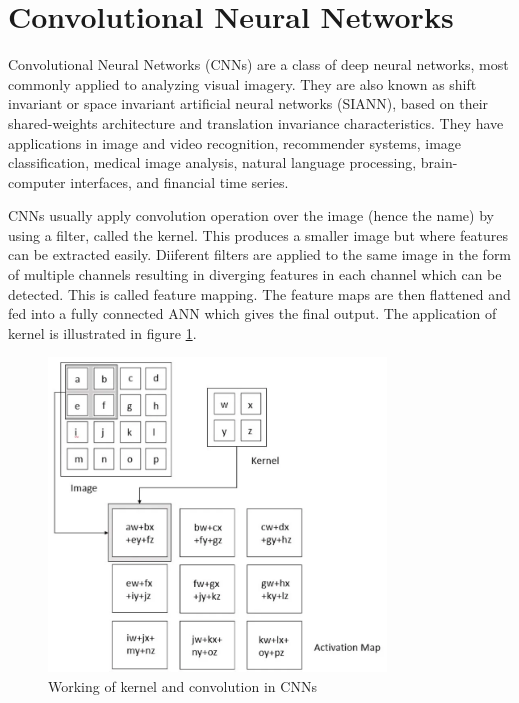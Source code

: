 \section{Convolutional Neural Networks}

Convolutional Neural Networks (CNNs) are a class of deep neural networks, most commonly applied to analyzing visual imagery. They are also known as shift invariant or space invariant artificial neural networks (SIANN), based on their shared-weights architecture and translation invariance characteristics. They have applications in image and video recognition, recommender systems, image classification, medical image analysis, natural language processing, brain-computer interfaces, and financial time series.

CNNs usually apply convolution operation over the image (hence the name) by using a filter, called the kernel. This produces a smaller image but where features can be extracted easily. Diiferent filters are applied to the same image in the form of multiple channels resulting in diverging features in each channel which can be detected. This is called feature mapping. The feature maps are then flattened and fed into a fully connected ANN which gives the final output. The application of kernel is illustrated in figure \ref{cnn}.
\\
\begin{figure}[h]
	\centering
	\includegraphics[width=0.8\textwidth]{images/cnn.png}
	\caption{Working of kernel and convolution in CNNs \cite{Goodfellow-et-al-2016}}
	\label{cnn}
\end{figure}

